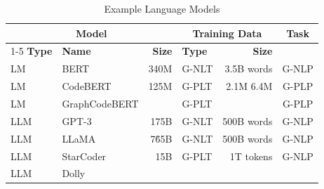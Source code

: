 \begin{table}[htbp]
\centering
\caption{Example Language Models}
\label{modelExample}
\begin{tabular}{|l|l|r|l|r|c|}
\hline
\multicolumn{3}{|c}{\textbf{Model}} &
\multicolumn{2}{|c|}{\textbf{Training Data}} &
\multirow[t]{2}{*}{\textbf{Task}} \\
\cline{1-5}
\textbf{Type} & \textbf{Name} & \textbf{Size} & \textbf{Type} & \textbf{Size} &  \\ \hline
LM & BERT & 340M & G-NLT & 3.5B words & G-NLP \\ \hline
LM & CodeBERT & 125M & G-PLT & 2.1M  6.4M & G-PLP \\ \hline
LM & GraphCodeBERT &  & G-PLT &   & G-PLP \\ \hline
LLM & GPT-3 & 175B & G-NLT &  500B words  & G-NLP \\ \hline
LLM & LLaMA & 7\~65B & G-NLT &  500B words  & G-NLP \\ \hline
LLM & StarCoder & 15B & G-PLT &  1T tokens  & G-NLP \\ \hline
LLM & Dolly &  & &  & \\ \hline
\end{tabular}
\end{table}



